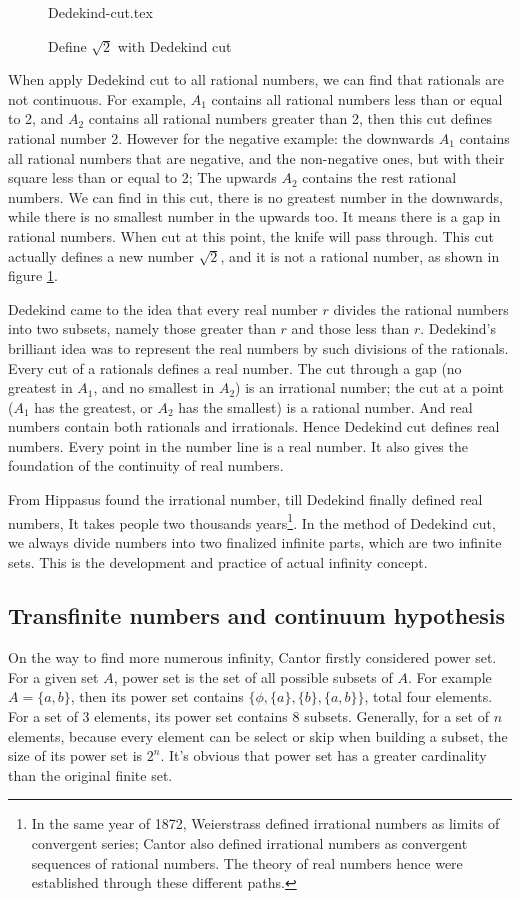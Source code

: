 \documentclass{article}
\begin{document}
\begin{figure}[htbp]
 \centering
 {Dedekind-cut.tex}
 \caption{Define $\sqrt{2}$ with Dedekind cut}
 \label{fig:Dedekind-cut}
\end{figure}

When apply Dedekind cut to all rational numbers, we can find that rationals are not continuous. For example, $A_1$ contains all rational numbers less than or equal to 2, and $A_2$ contains all rational numbers greater than 2, then this cut defines rational number 2. However for the negative example: the downwards $A_1$ contains all rational numbers that are negative, and the non-negative ones, but with their square less than or equal to 2; The upwards $A_2$ contains the rest rational numbers. We can find in this cut, there is no greatest number in the downwards, while there is no smallest number in the upwards too. It means there is a gap in rational numbers. When cut at this point, the knife will pass through. This cut actually defines a new number $\sqrt{2}$, and it is not a rational number, as shown in figure \ref{fig:Dedekind-cut}.

Dedekind came to the idea that every real number $r$ divides the rational numbers into two subsets, namely those greater than $r$ and those less than $r$. Dedekind's brilliant idea was to represent the real numbers by such divisions of the rationals. Every cut of a rationals defines a real number. The cut through a gap (no greatest in $A_1$, and no smallest in $A_2$) is an irrational number; the cut at a point ($A_1$ has the greatest, or $A_2$ has the smallest) is a rational number. And real numbers contain both rationals and irrationals. Hence Dedekind cut defines real numbers. Every point in the number line is a real number. It also gives the foundation of the continuity of real numbers.

From Hippasus found the irrational number, till Dedekind finally defined real numbers, It takes people two thousands years\footnote{In the same year of 1872, Weierstrass defined irrational numbers as limits of convergent series; Cantor also defined irrational numbers as convergent sequences of rational numbers. The theory of real numbers hence were established through these different paths.}. In the method of Dedekind cut, we always divide numbers into two finalized infinite parts, which are two infinite sets. This is the development and practice of actual infinity concept.

\subsection{Transfinite numbers and continuum hypothesis}
On the way to find more numerous infinity, Cantor firstly considered power set. For a given set $A$, power set is the set of all possible subsets of $A$. For example $A = \{a, b\}$, then its power set contains $\{\phi, \{a\}, \{b\}, \{a, b\}\}$, total four elements. For a set of 3 elements, its power set contains 8 subsets. Generally, for a set of $n$ elements, because every element can be select or skip when building a subset, the size of its power set is $2^n$. It's obvious that power set has a greater cardinality than the original finite set.
\end{document}
